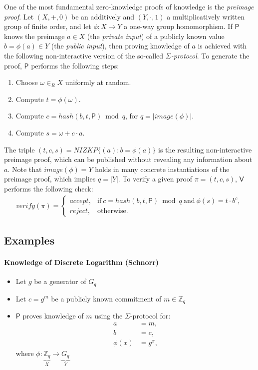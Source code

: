 \documentclass[bibtotoc,halfparskip,oneside]{scrreprt}
\newcommand{\Prover}{\ensuremath{\mathsf{P}}\xspace}
\newcommand{\Verifier}{\ensuremath{\mathsf{V}}\xspace}
\begin{document}
	One of the most fundamental zero-knowledge proofs of knowledge is the \emph{preimage proof}. Let $(X,+,0)$ be an additively and $(Y,\cdot,1)$ a multiplicatively written group of finite order, and let $\phi:X\rightarrow Y$ a one-way group homomorphism. If $\Prover$ knows the preimage $a\in X$ (the \emph{private input}) of a publicly known value $b=\phi(a)\in Y$ (the \emph{public input}), then proving knowledge of $a$ is achieved with the following non-interactive version of the so-called \emph{$\Sigma$-protocol}. To generate the proof, $\Prover$ performs the following steps:
	\begin{enumerate}
		\item Choose $\omega\in_R X$ uniformly at random.
		\item Compute $t=\phi(\omega)$.
		\item Compute $c = \mathit{hash}(b,t,\Prover) \bmod{q}$, for $q=|\mathit{image}(\phi)|$.
		\item Compute $s = \omega + c\cdot a$.
	\end{enumerate}
	The triple $(t,c,s)=\mathit{NIZKP}\{(a):b=\phi(a)\}$ is the resulting non-interactive preimage proof, which can be published without revealing any information about $a$. Note that $\mathit{image}(\phi)=Y$ holds in many concrete instantiations of the  preimage proof, which implies $q=|Y|$. To verify a given proof $\pi=(t,c,s)$, $\Verifier$ performs the following check:
	\begin{align}
		\mathit{verify}(\pi)=\begin{cases}
			\mathit{accept}, & \text{if}~ c = \mathit{hash}(b,t,\Prover) \bmod{q} ~\text{and}~\phi(s)=t\cdot b^c,\\
			\mathit{reject}, & \text{otherwise}.
		\end{cases}
	\end{align}
	
	
	\subsection{Examples}
	
	\paragraph*{Knowledge of Discrete Logarithm (Schnorr)}
	\begin{itemize}
		\item Let $g$ be a generator of $G_q$
		\item Let $c=g^m $ be a publicly known commitment of $m\in\mathbb{Z}_q$ 
		\item $\Prover$ proves knowledge of $m$ using the $\Sigma$-protocol for:
		\begin{align*}
			a &= m,\\
			b &= c,\\
			\phi(x)&=g^x,
		\end{align*}
		where $\phi:\underbrace{\mathbb{Z}_q}_X\rightarrow \underbrace{G_q}_Y$
	\end{itemize}
	
\end{document}
